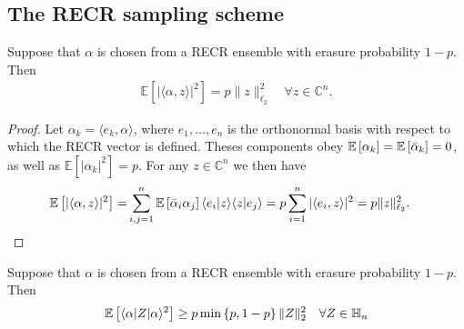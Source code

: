 \subsection{The RECR sampling scheme}

\begin{lemma}
Suppose that $\alpha$ is chosen from a RECR ensemble with erasure probability $1-p$. Then
\begin{align*}
  \mathbb{E} \left[ | \langle  \alpha, z \rangle|^2 \right] = p \|  z \|_{\ell_2}^2
  \quad \forall  z \in \mathbb{C}^n.
\end{align*}
\end{lemma}

\begin{proof}
Let $\alpha_k = \langle  e_k, \alpha\rangle$, where $ e_1,\ldots, e_n$ is the orthonormal basis with respect to which the RECR vector is defined.
Theses components obey $\mathbb{E}\left[ \alpha_k \right] = \mathbb{E} \left[ \bar{\alpha}_k \right] = 0$, as well as $\mathbb{E} \left[ |\alpha_k|^2 \right] = p$.
For any $ z \in \mathbb{C}^n$ we then have
\begin{align*}
  \mathbb{E} \left[| \langle  \alpha,  z\rangle |^2 \right]
  =& \sum_{i,j=1}^n \mathbb{E} \left[ \bar{\alpha}_i \alpha_j \right] \langle  e_i |  z \rangle \langle  z |  e_j \rangle = p \sum_{i=1}^n | \langle  e_i,  z \rangle|^2 = p \|  z \|_{\ell_2}^2.
\end{align*}
\end{proof}

\begin{lemma}
  \label{lem:recr_subisotropic}
  Suppose that $\alpha$ is chosen from a RECR ensemble with erasure probability $1-p$. Then
  \begin{equation*}
  \mathbb{E} \left[ \langle  \alpha|  Z | \alpha \rangle^2 \right] \geq p \min \left\{ p, 1-p \right\} \|  Z \|_2^2 \quad \forall  Z \in \mathbb{H}_n
  \end{equation*}
\end{lemma}

